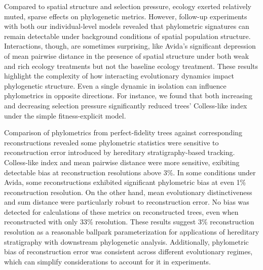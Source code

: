 Compared to spatial structure and selection pressure, ecology exerted relatively muted, sparse effects on phylogenetic metrics.
However, follow-up experiments with both our individual-level models revealed that phylometric signatures can remain detectable under background conditions of spatial population structure.
Interactions, though, are sometimes surprising, like Avida's significant depression of mean pairwise distance in the presence of spatial structure under both weak and rich ecology treatments but not the baseline ecology treatment.
These results highlight the complexity of how interacting evolutionary dynamics impact phylogenetic structure.
Even a single dynamic in isolation can influence phylometrics in opposite directions.
For instance, we found that both increasing and decreasing selection pressure significantly reduced trees' Colless-like index under the simple fitness-explicit model.

Comparison of phylometrics from perfect-fidelity trees against corresponding reconstructions revealed some phylometric statistics were sensitive to reconstruction error introduced by hereditary stratigraphy-based tracking.
Colless-like index and mean pairwise distance were more sensitive, exibiting detectable bias at reconstruction resolutions above 3\%.
In some conditions under Avida, some reconstructions exhibited significant phylometric bias at even 1\% reconstruction resolution.
On the other hand, mean evolutionary distinctiveness and sum distance were particularly robust to reconstruction error.
No bias was detected for calculations of these metrics on reconstructed trees, even when reconstructed with only 33\% resolution.
These results suggest 3\% reconstruction resolution as a reasonable ballpark parameterization for applications of hereditary stratigraphy with downstream phylogenetic analysis.
Additionally, phylometric bias of reconstruction error was consistent across different evolutionary regimes, which can simplify considerations to account for it in experiments.

